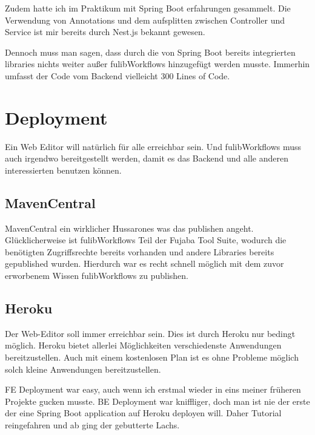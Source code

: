 Zudem hatte ich im Praktikum mit Spring Boot erfahrungen gesammelt.
Die Verwendung von Annotations und dem aufsplitten zwischen Controller und Service ist mir bereits
durch Nest.js bekannt gewesen.

Dennoch muss man sagen, dass durch die von Spring Boot bereits integrierten libraries nichts weiter
außer fulibWorkflows hinzugefügt werden musste.
Immerhin umfasst der Code vom Backend vielleicht 300 Lines of Code.

\section{Deployment}\label{sec:deployment}
Ein Web Editor will natürlich für alle erreichbar sein.
Und fulibWorkflows muss auch irgendwo bereitgestellt werden, damit es das Backend und alle anderen
interessierten benutzen können.

\subsection{MavenCentral}\label{subsec:mavencentral}
MavenCentral ein wirklicher Hussarones was das publishen angeht.
Glücklicherweise ist fulibWorkflows Teil der Fujaba Tool Suite, wodurch die benötigten
Zugriffsrechte bereits vorhanden und andere Libraries bereits gepublished wurden.
Hierdurch war es recht schnell möglich mit dem zuvor erworbenem Wissen fulibWorkflows
zu publishen.

\subsection{Heroku}\label{subsec:heroku}
Der Web-Editor soll immer erreichbar sein.
Dies ist durch Heroku nur bedingt möglich.
Heroku bietet allerlei Möglichkeiten verschiedenste Anwendungen bereitzustellen.
Auch mit einem kostenlosen Plan ist es ohne Probleme möglich solch kleine Anwendungen bereitzustellen.

FE Deployment war easy, auch wenn ich erstmal wieder in eins meiner früheren Projekte gucken musste.
BE Deployment war kniffliger, doch man ist nie der erste der eine Spring Boot application
auf Heroku deployen will.
Daher Tutorial reingefahren und ab ging der gebutterte Lachs.